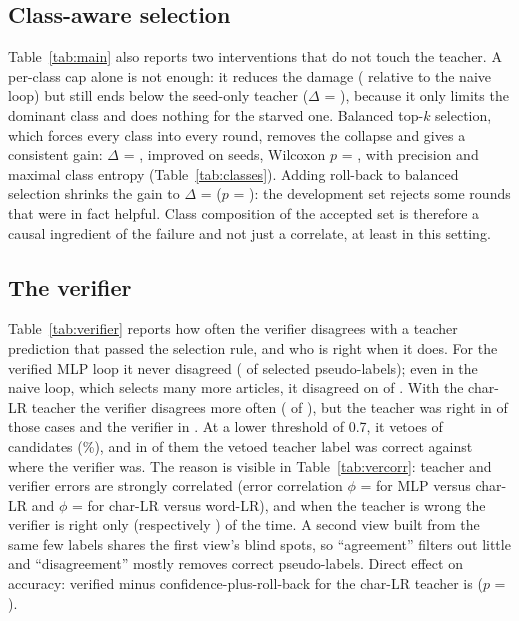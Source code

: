 \documentclass[11pt]{article}
\begin{document}
\begin{table}[t]
\centering\small
\caption{Round-0 confidence diagnostics on the unlabeled pool (mean over seeds): mean and median confidence per true class, share above the 0.9 threshold, confidently wrong predictions (count per seed) and recall. The calibrated char-LR is shown for contrast.}\label{tab:diag}
\resizebox{\textwidth}{!}{}
\end{table}

\subsection{Class-aware selection}
Table~\ref{tab:main} also reports two interventions that do not touch the teacher. A per-class cap alone is not enough: it reduces the damage (\cmpCapVsNaive{} relative to the naive loop) but still ends below the seed-only teacher ($\Delta$ = \cmpMainCap), because it only limits the dominant class and does nothing for the starved one. Balanced top-$k$ selection, which forces every class into every round, removes the collapse and gives a consistent gain: $\Delta$ = \cmpMainBalanced, improved on \nimpMainBalanced{} seeds, Wilcoxon $p$ = \pMainBalanced, with precision \precMainBalanced{} and maximal class entropy (Table~\ref{tab:classes}). Adding roll-back to balanced selection shrinks the gain to $\Delta$ = \cmpMainBalancedRb ($p$ = \pMainBalancedRb): the development set rejects some rounds that were in fact helpful. Class composition of the accepted set is therefore a causal ingredient of the failure and not just a correlate, at least in this setting.

\subsection{The verifier}\label{sec:verifier}
Table~\ref{tab:verifier} reports how often the verifier disagrees with a teacher prediction that passed the selection rule, and who is right when it does. For the verified MLP loop it never disagreed (\verMainDis{} of \verMainSel{} selected pseudo-labels); even in the naive loop, which selects many more articles, it disagreed on \verNaiveDis{} of \verNaiveSel{}. With the char-LR teacher the verifier disagrees more often (\verCharDis{} of \verCharSel{}), but the teacher was right in \verCharTeacherRight{} of those cases and the verifier in \verCharVerRight. At a lower threshold of 0.7, it vetoes \verThrDis{} of \verThrSel{} candidates (\verThrRate\%), and in \verThrTeacherRight{} of them the vetoed teacher label was correct against \verThrVerRight{} where the verifier was. The reason is visible in Table~\ref{tab:vercorr}: teacher and verifier errors are strongly correlated (error correlation $\phi$ = \phiMlp for MLP versus char-LR and $\phi$ = \phiCharlr for char-LR versus word-LR), and when the teacher is wrong the verifier is right only \pvrMlp{} (respectively \pvrCharlr) of the time. A second view built from the same few labels shares the first view's blind spots, so ``agreement'' filters out little and ``disagreement'' mostly removes correct pseudo-labels. Direct effect on accuracy: verified minus confidence-plus-roll-back for the char-LR teacher is \cmpCharAgreeEffect{} ($p$ = \pCharAgreeEffect).
\end{document}
